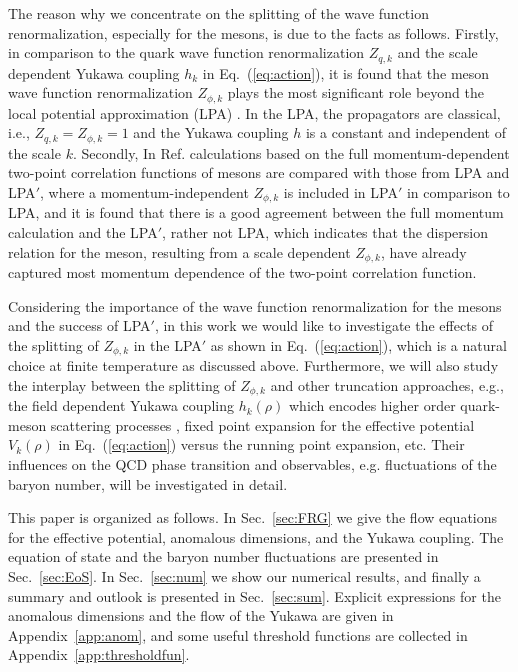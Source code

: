 \documentclass[%
reprint,
superscriptaddress,
showpacs,preprintnumbers,
 amsmath,amssymb,
 aps,
prd,
]{revtex4-1}
\def\Eq#1{Eq.~(\ref{#1})}
\def\sec#1{Sec.~\ref{#1}}
\def\app#1{Appendix~\ref{#1}}
\begin{document}
The reason why we concentrate on the splitting of the wave function renormalization, especially for the mesons, is due to the facts as follows. Firstly, in comparison to the quark wave function renormalization $Z_{q,k}$ and the scale dependent Yukawa coupling $h_k$ in \Eq{eq:action}, it is found that the meson wave function renormalization $Z_{\phi,k}$ plays the most significant role beyond the local potential approximation (LPA) \cite{Pawlowski:2014zaa,Fu:2015naa}. In the LPA, the propagators are classical, i.e., $Z_{q,k}=Z_{\phi,k}=1$ and the Yukawa coupling $h$ is a constant and independent of the scale $k$. Secondly, In Ref. \cite{Helmboldt:2014iya} calculations based on the full momentum-dependent two-point correlation functions of mesons are compared with those from LPA and LPA$'$, where a momentum-independent $Z_{\phi,k}$ is included in LPA$'$ in comparison to LPA, and it is found that there is a good agreement between the full momentum calculation and the LPA$'$, rather not LPA, which indicates that the dispersion relation for the meson, resulting from a scale dependent $Z_{\phi,k}$, have already captured most momentum dependence of the two-point correlation function. 

Considering the importance of the wave function renormalization for the mesons and the success of LPA$'$, in this work we would like to investigate the effects of the splitting of $Z_{\phi,k}$ in the LPA$'$ as shown in \Eq{eq:action}, which is a natural choice at finite temperature as discussed above. Furthermore, we will also study the interplay between the splitting of $Z_{\phi,k}$ and other truncation approaches, e.g., the field dependent Yukawa coupling $h_k(\rho)$ which encodes higher order quark-meson scattering processes \cite{Pawlowski:2014zaa}, fixed point expansion for the effective potential $V_k(\rho)$ in \Eq{eq:action} versus the running point expansion, etc. Their influences on the QCD phase transition and observables, e.g. fluctuations of the baryon number, will be investigated in detail.

This paper is organized as follows. In \sec{sec:FRG} we give the flow equations for the effective potential, anomalous dimensions, and the Yukawa coupling. The equation of state and the baryon number fluctuations are presented in \sec{sec:EoS}. In \sec{sec:num} we show our numerical results, and finally a summary and outlook is presented in \sec{sec:sum}. Explicit expressions for the anomalous dimensions and the flow of the Yukawa are given in \app{app:anom}, and some useful threshold functions are collected in \app{app:thresholdfun}.
\end{document}
